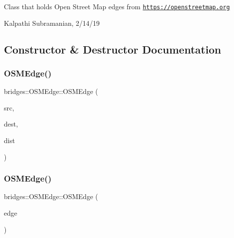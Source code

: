 Class that holds Open Street Map edges from \href{https://openstreetmap.org}{\tt https\+://openstreetmap.\+org}

Kalpathi Subramanian, 2/14/19 

\subsection{Constructor \& Destructor Documentation}
\mbox{\label{classbridges_1_1_o_s_m_edge_ace6b587439a5c3957f72a9d48e9782eb}} 
\subsubsection{\texorpdfstring{O\+S\+M\+Edge()}{OSMEdge()}\hspace{0.1cm}{\footnotesize\ttfamily [1/2]}}
{\footnotesize\ttfamily bridges\+::\+O\+S\+M\+Edge\+::\+O\+S\+M\+Edge (\begin{DoxyParamCaption}\item[{int}]{src,  }\item[{int}]{dest,  }\item[{double}]{dist }\end{DoxyParamCaption})\hspace{0.3cm}{\ttfamily [inline]}}

\mbox{\label{classbridges_1_1_o_s_m_edge_ab76af0cbc8a84362edc6912e243ff2ef}} 
\subsubsection{\texorpdfstring{O\+S\+M\+Edge()}{OSMEdge()}\hspace{0.1cm}{\footnotesize\ttfamily [2/2]}}
{\footnotesize\ttfamily bridges\+::\+O\+S\+M\+Edge\+::\+O\+S\+M\+Edge (\begin{DoxyParamCaption}\item[{const \mbox{\hyperlink{classbridges_1_1_o_s_m_edge}{O\+S\+M\+Edge}} $\ast$}]{edge }\end{DoxyParamCaption})\hspace{0.3cm}{\ttfamily [inline]}}




